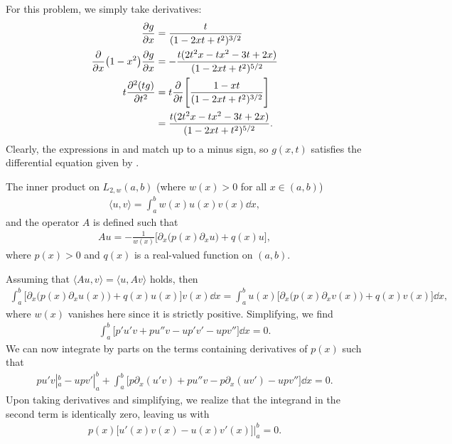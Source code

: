 For this problem, we simply take derivatives:
\begin{align}
    \label{eq:derivs-1}
    \pdv{g}{x} &= \frac{t}{(1 - 2xt + t^2)^{3/2}} \\
    \label{eq:derivs-2}
    \pdv{x}(1-x^2)\pdv{g}{x} &= -\frac{t(2t^2x - tx^2 - 3t + 2x)}{(1 - 2xt + t^2)^{5/2}} \\
    t \pdv[2]{(tg)}{t} &= t\pdv{t} \Bigg[ \frac{1 - xt}{(1 - 2xt + t^2)^{3/2}} \Bigg] \notag \\
    \label{eq:derivs-3}
                     &= \frac{t(2t^2x - tx^2 - 3t + 2x)}{(1 - 2xt + t^2)^{5/2}}
.\end{align}
Clearly, the expressions in  and  match up to a minus sign, so $g(x,t)$ satisfies the differential equation given by .



The inner product on $L_{2,w}(a,b)$ (where $w(x) > 0$ for all $x \in (a,b)$)
\begin{eqnarray}
    \label{eq:inner-product}
    \langle u,v \rangle = \int_{a}^{b} w(x) u(x) v(x) \dd{x}
,\end{eqnarray}
and the operator $A$ is defined such that
\begin{eqnarray}
    \label{eq:operator-A}
    Au = -\frac{1}{w(x)}\Big[ \partial_{x} \big( p(x) \partial_{x} u \big) + q(x) u \Big] 
,\end{eqnarray}
where $p(x) > 0$ and $q(x)$ is a real-valued function on $(a,b)$.

Assuming that $\langle Au,v \rangle = \langle u,Av \rangle$ holds, then
\begin{eqnarray}
    \label{eq:forward-direc}
    \int_{a}^{b} \Big[ \partial_{x} \big( p(x)\partial_{x}u(x) \big) + q(x)u(x) \Big] v(x) \dd{x} = \int_{a}^{b} u(x) \Big[ \partial_{x} \big( p(x)\partial_{x}v(x) \big) + q(x)v(x) \Big] \dd{x}
,\end{eqnarray}
where $w(x)$ vanishes here since it is strictly positive.
Simplifying, we find
\begin{eqnarray}
    \label{eq:simplify-forward-direc}
    \int_{a}^{b} \Big[ p'u'v + pu''v - up'v' - upv'' \Big] \dd{x} = 0
.\end{eqnarray}
We can now integrate by parts on the terms containing derivatives of $p(x)$ such that
\begin{eqnarray}
    \label{eq:int-by-parts}
    pu'v|_{a}^{b} - upv'|_{a}^{b} + \int_{a}^{b} \big[ p\partial_{x}(u'v) + pu''v - p\partial_{x}(uv') - upv'' \big] \dd{x} = 0
.\end{eqnarray}
Upon taking derivatives and simplifying, we realize that the integrand in the second term is identically zero, leaving us with
\begin{eqnarray}
    \label{eq:forward-res}
    p(x) \big[ u'(x)v(x) - u(x)v'(x) \big]\big|_{a}^{b} = 0
.\end{eqnarray}

